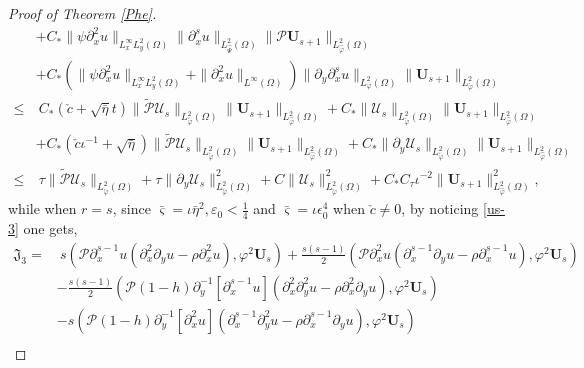 \documentclass[10pt,a4paper]{amsart}
\begin{document}
\begin{proof}[Proof of Theorem \ref{Phe}]
\begin{align*}
    &+C_{*}\|\psi\partial_{x}^{2}u\|_{L_{x}^{\infty}L_{y}^{2}(\Omega)}\|\partial_{x}^{s}u\|_{L_{\hat{\Psi}}^{2}(\Omega)}
           \|\mathcal{P}\mathbf{U}_{s+1}\|_{L_{\hat{\varphi}}^{2}(\Omega)}\nonumber\\
    &+C_{*}\left(\|\psi\partial_{x}^{2}u\|_{L_{x}^{\infty}L_{y}^{2}(\Omega)}+\|\partial_{x}^{2}u\|_{L^{\infty}(\Omega)}\right)
           \|\partial_{y}\partial_{x}^{s}u\|_{L_{\varphi}^{2}(\Omega)}\|\mathbf{U}_{s+1}\|_{L_{\check{\varphi}}^{2}(\Omega)}\\
\leq&~C_{*}(\check{c}+\sqrt{\bar{\eta}}t)\|\tilde{\mathcal{P}}\mathcal{U}_{s}\|_{L_{\tilde{\varphi}}^{2}(\Omega)}
                                             \|\mathbf{U}_{s+1}\|_{L_{\hat{\varphi}}^{2}(\Omega)}
     +C_{*}\|\mathcal{U}_{s}\|_{L_{\tilde{\varphi}}^{2}(\Omega)}\|\mathbf{U}_{s+1}\|_{L_{\hat{\varphi}}^{2}(\Omega)}\nonumber\\
    &+C_{*}(\check{c}\iota^{-1}+\sqrt{\bar{\eta}})\|\tilde{\mathcal{P}}\mathcal{U}_{s}\|_{L_{\tilde{\varphi}}^{2}(\Omega)}
                                                  \|\mathbf{U}_{s+1}\|_{L_{\hat{\varphi}}^{2}(\Omega)}
     +C_{*}\|\partial_{y}\mathcal{U}_{s}\|_{L_{\tilde{\varphi}}^{2}(\Omega)}\|\mathbf{U}_{s+1}\|_{L_{\hat{\varphi}}^{2}(\Omega)}\nonumber\\
\leq&~\tau\|\tilde{\mathcal{P}}\mathcal{U}_{s}\|_{L_{\tilde{\varphi}}^{2}(\Omega)}
     +\tau\|\partial_{y}\mathcal{U}_{s}\|_{L_{\tilde{\varphi}}^{2}(\Omega)}^{2}
     +C\|\mathcal{U}_{s}\|_{L_{\tilde{\varphi}}^{2}(\Omega)}^{2}
     +C_{*}C_{\tau}\iota^{-2}\|\mathbf{U}_{s+1}\|_{L_{\hat{\varphi}}^{2}(\Omega)}^{2},\nonumber
\end{align*}
while when $r=s$, since $\bar{\varsigma}=\iota\bar{\eta}^{2},\varepsilon_{0}<\frac{1}{4}$ and $\bar{\varsigma}=\iota\epsilon_{0}^{4}$ when $\check{c}\neq 0$, by noticing \eqref{us-3} one gets,
\begin{align*}
\mathfrak{J}_{3}
=&~s(\mathcal{P}\partial_{x}^{s-1}u(\partial_{x}^{2}\partial_{y}u-\rho\partial_{x}^{2}u),\varphi^{2}\mathbf{U}_{s})
  +\frac{s(s-1)}{2}(\mathcal{P}\partial_{x}^{2}u(\partial_{x}^{s-1}\partial_{y}u-\rho\partial_{x}^{s-1}u),\varphi^{2}\mathbf{U}_{s})\\
 &-\frac{s(s-1)}{2}(\mathcal{P}(1-h)\partial_{y}^{-1}[\partial_{x}^{s-1}u](\partial_{x}^{2}\partial_{y}^{2}u-\rho\partial_{x}^{2}\partial_{y}u),\varphi^{2}\mathbf{U}_{s})\\
 &-s(\mathcal{P}(1-h)\partial_{y}^{-1}[\partial_{x}^{2}u](\partial_{x}^{s-1}\partial_{y}^{2}u-\rho\partial_{x}^{s-1}\partial_{y}u),\varphi^{2}\mathbf{U}_{s})\nonumber\\

\end{align*}
\end{proof}
\end{document}
